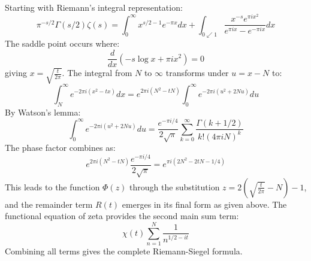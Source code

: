 \documentclass{article}
\begin{document}
Starting with Riemann's integral representation:
\begin{equation}
  \pi^{- s / 2} \Gamma (s / 2) \zeta (s) = \int_0^{\infty} x^{s / 2 - 1} e^{-
  \pi x} dx + \int_{0 \swarrow 1} \frac{x^{- s} e^{\pi ix^2}}{e^{\pi ix} -
  e^{- \pi ix}} dx
\end{equation}
The saddle point occurs where:
\begin{equation}
  \frac{d}{dx}  (- s \log x + \pi ix^2) = 0
\end{equation}
giving $x = \sqrt{\frac{t}{2 \pi}}$. The integral from $N$ to $\infty$
transforms under $u = x - N$ to:
\begin{equation}
  \int_N^{\infty} e^{- 2 \pi i (x^2 - tx)} dx = e^{2 \pi i (N^2 - tN)} 
  \int_0^{\infty} e^{- 2 \pi i (u^2 + 2 Nu)} du
\end{equation}
By Watson's lemma:
\begin{equation}
  \int_0^{\infty} e^{- 2 \pi i (u^2 + 2 Nu)} du = \frac{e^{- \pi i / 4}}{2
  \sqrt{\pi}}  \sum_{k = 0}^{\infty} \frac{\Gamma (k + 1 / 2)}{k! (4 \pi
  iN)^k}
\end{equation}
The phase factor combines as:
\begin{equation}
  e^{2 \pi i (N^2 - tN)}  \frac{e^{- \pi i / 4}}{2 \sqrt{\pi}} = e^{\pi i (2
  N^2 - 2 tN - 1 / 4)}
\end{equation}
This leads to the function $\Phi (z)$ through the substitution $z = 2
(\sqrt{\frac{t}{2 \pi}} - N) - 1$, and the remainder term $R (t)$ emerges in
its final form as given above. The functional equation of zeta provides the
second main sum term:
\begin{equation}
  \chi (t)  \sum_{n = 1}^N \frac{1}{n^{1 / 2 - it}}
\end{equation}
Combining all terms gives the complete Riemann-Siegel formula.
\end{document}
